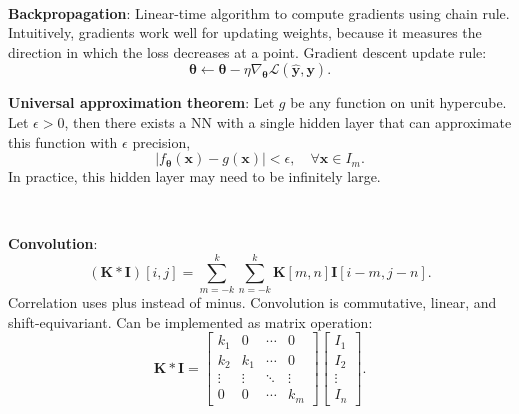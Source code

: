\documentclass{article}
\renewcommand{\vec}[1]{\bm{#1}}
\newcommand{\mat}[1]{\bm{#1}}
\newenvironment{topic}[1]
{\textbf{\sffamily \colorbox{black}{\rlap{\textbf{\textcolor{white}{#1}}}\hspace{\linewidth}\hspace{-2\fboxsep}}} \\ \vspace{0.2cm}}
{}
\begin{document}
\begin{multicols*}{2}
\begin{topic}{Neural networks}
        \textbf{Backpropagation}: Linear-time algorithm to compute gradients using chain rule.
        Intuitively, gradients work well for updating weights, because it measures the direction in
        which the loss decreases at a point. Gradient descent update rule: \[
            \vec{\theta} \gets \vec{\theta} - \eta \nabla_{\vec{\theta}} \mathcal{L}(\hat{\vec{y}}, \vec{y}).
        \]

        \textbf{Universal approximation theorem}: Let $g$ be any function on unit hypercube. Let
        $\epsilon > 0$, then there exists a NN with a single hidden layer that can
        approximate this function with $\epsilon$ precision, \[
            | f_{\vec{\theta}}(\vec{x}) - g(\vec{x}) | < \epsilon, \quad \forall \vec{x} \in I_m.
        \]
        In practice, this hidden layer may need to be infinitely large.

    \end{topic}

    \begin{topic}{Convolutional neural networks}

        \textbf{Convolution}: \[
            (\mat{K} * \mat{I})[i,j] = \sum_{m=-k}^{k} \sum_{n=-k}^{k} \mat{K}[m,n] \mat{I}[i-m, j-n].
        \]
        Correlation uses plus instead of minus. Convolution is commutative, linear, and shift-equivariant.
        Can be implemented as matrix operation: \[
            \mat{K} * \mat{I} = \begin{bmatrix}
                k_1    & 0      & \cdots & 0      \\
                k_2    & k_1    & \cdots & 0      \\
                \vdots & \vdots & \ddots & \vdots \\
                0      & 0      & \cdots & k_m
            \end{bmatrix}
            \begin{bmatrix}
                I_1 \\ I_2 \\ \vdots \\ I_n
            \end{bmatrix}.
        \]


\end{topic}
\end{multicols*}
\end{document}
